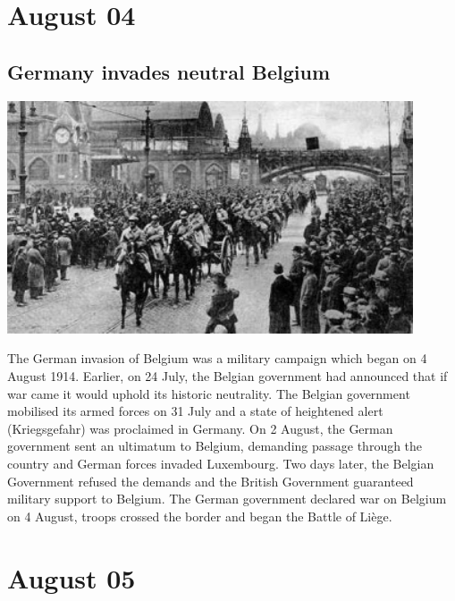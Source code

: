 \documentclass[11pt]{report}
\begin{document}
\section{August 04}
\subsection{Germany invades neutral Belgium}
\vspace{2mm}\begin{center}\includegraphics[width=12cm]{./img/germanyInBelgium.jpg}\end{center}
The German invasion of Belgium was a military campaign which began on 4 August 1914. Earlier, on 24 July, the Belgian government had announced that if war came it would uphold its historic neutrality. The Belgian government mobilised its armed forces on 31 July and a state of heightened alert (Kriegsgefahr) was proclaimed in Germany. On 2 August, the German government sent an ultimatum to Belgium, demanding passage through the country and German forces invaded Luxembourg. Two days later, the Belgian Government refused the demands and the British Government guaranteed military support to Belgium. The German government declared war on Belgium on 4 August, troops crossed the border and began the Battle of Liège.

\section{August 05}
\end{document}
